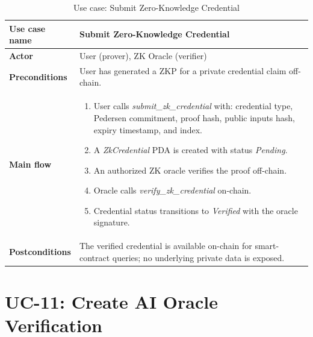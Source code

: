 \begin{table}[H]
\centering
\caption{Use case: Submit Zero-Knowledge Credential}
\begin{tabular}{|l|p{10cm}|}
\hline
\textbf{Use case name} & Submit Zero-Knowledge Credential \\ \hline
\textbf{Actor} & User (prover), ZK Oracle (verifier) \\ \hline
\textbf{Preconditions} & User has generated a ZKP for a private credential claim off-chain. \\ \hline
\textbf{Main flow} & \begin{enumerate}[noitemsep]
    \item User calls \emph{submit\_zk\_credential} with: credential type, Pedersen commitment, proof hash, public inputs hash, expiry timestamp, and index.
    \item A \emph{ZkCredential} PDA is created with status \emph{Pending}.
    \item An authorized ZK oracle verifies the proof off-chain.
    \item Oracle calls \emph{verify\_zk\_credential} on-chain.
    \item Credential status transitions to \emph{Verified} with the oracle signature.
\end{enumerate} \\ \hline
\textbf{Postconditions} & The verified credential is available on-chain for smart-contract queries; no underlying private data is exposed. \\ \hline
\end{tabular}
\end{table}

\section*{UC-11: Create AI Oracle Verification}

